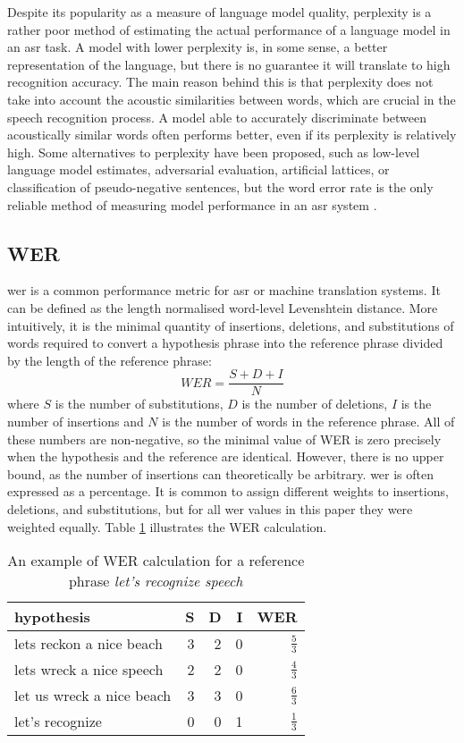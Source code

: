 	Despite its popularity as a measure of language model quality, perplexity is a rather poor method of estimating the actual performance of a language model in an \gls{asr} task. A model with lower perplexity is, in some sense, a better representation of the language, but there is no guarantee it will translate to high recognition accuracy. The main reason behind this is that perplexity does not take into account the acoustic similarities between words, which are crucial in the speech recognition process. A model able to accurately discriminate between acoustically similar words often performs better, even if its perplexity is relatively high. Some alternatives to perplexity have been proposed, such as low-level language model estimates, adversarial evaluation, artificial lattices, or classification of pseudo-negative sentences, but the word error rate is the only reliable method of measuring model performance in an \gls{asr} system \cite{pauls2012large}\cite{smith2012adversarial}.
	\subsection{WER}
	\label{subsection:wer}
	\gls{wer} is a common performance metric for \gls{asr} or machine translation systems. It can be defined as the length normalised word-level Levenshtein distance. More intuitively, it is the minimal quantity of insertions, deletions, and substitutions of words required to convert a hypothesis phrase into the reference phrase divided by the length of the reference phrase:
	\begin{equation*}
		WER=\frac{S+D+I}{N}
	\end{equation*}
	where $S$ is the number of substitutions, $D$ is the number of deletions, $I$ is the number of insertions and $N$ is the number of words in the reference phrase. All of these numbers are non-negative, so the minimal value of WER is zero precisely when the hypothesis and the reference are identical. However, there is no upper bound, as the number of insertions can theoretically be arbitrary. \gls{wer} is often expressed as a percentage. It is common to assign different weights to insertions, deletions, and substitutions, but for all \gls{wer} values in this paper they were weighted equally. Table \ref{table:werr} illustrates the WER calculation. 

\begin{table}[h!]
	\caption{An example of WER calculation for a reference phrase \textit{let's recognize speech}}
  \label{table:werr}
    \centering
    \begin{tabular*}{.6\linewidth}{@{\extracolsep{\fill}}lrrrr}
	        hypothesis                  & S & D & I & WER\\
		\midrule
		lets reckon a nice beach    & 3 & 2 & 0 & $\frac{5}{3}$\\
		lets wreck a nice speech    & 2 & 2 & 0 & $\frac{4}{3}$\\
		let us wreck a nice beach   & 3 & 3 & 0 & $\frac{6}{3}$\\
		let's recognize             & 0 & 0 & 1 & $\frac{1}{3}$\\
    \end{tabular*}
\end{table}

